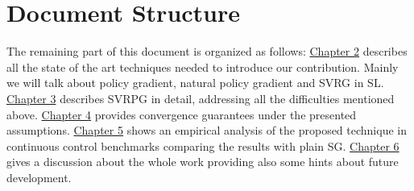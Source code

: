 \section{Document Structure}
The remaining part of this document is organized as follows:\newline
\newline
\hyperref[chap:art]{Chapter 2} describes all the state of the art techniques needed to introduce our contribution. Mainly we will talk about policy gradient, natural policy gradient and \acs{SVRG} in \acs{SL}.\newline
\hyperref[chap:art]{Chapter 3} describes \acs{SVRPG} in detail, addressing all the difficulties mentioned above.\newline
\hyperref[chap:art]{Chapter 4} provides convergence guarantees under the presented assumptions.\newline
\hyperref[chap:art]{Chapter 5} shows an empirical analysis of the proposed technique in continuous control benchmarks comparing the results with plain \acs{SG}.\newline
\hyperref[chap:art]{Chapter 6} gives a discussion about the whole work providing also some hints about future development.